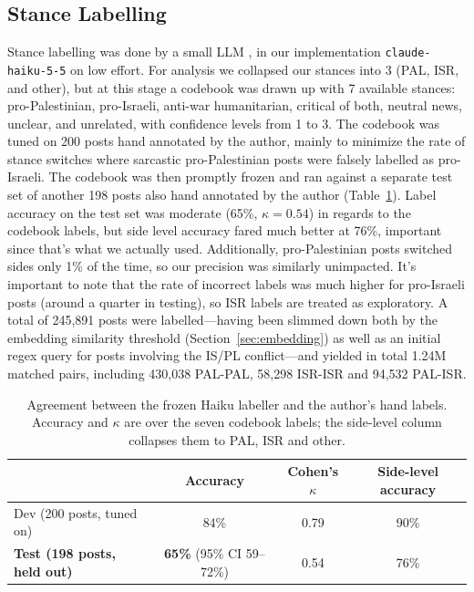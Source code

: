 \documentclass[11pt]{article}   %
\begin{document}
\subsection{Stance Labelling}\label{sec:stance}

Stance labelling was done by a small LLM \parencite[following][]{QuelleBovet2025}, in our implementation
\texttt{claude-haiku-5-5} on low effort. For analysis we collapsed our stances into 3 (PAL, ISR, and other), but at this stage a codebook was drawn up with 7 available stances:
pro-Palestinian, pro-Israeli, anti-war humanitarian, critical of both, neutral news, unclear, and unrelated, with confidence levels from 1 to 3. The codebook was tuned on 200 posts hand annotated by the author, mainly to minimize the rate
of stance switches where sarcastic pro-Palestinian posts were falsely labelled as pro-Israeli. The codebook was then promptly frozen and ran against a separate test set of another 198 posts also hand annotated by the author (Table~\ref{tab:stance-accuracy}).
Label accuracy on the test set was moderate (65\%, $\kappa = 0.54$) in regards to the codebook labels, but side level accuracy fared much better at 76\%, important since that's what we actually used. Additionally, pro-Palestinian posts
switched sides only 1\% of the time, so our precision was similarly unimpacted. It's important to note that the rate of incorrect labels
was much higher for pro-Israeli posts (around a quarter in testing), so ISR labels are treated as exploratory. A total of 245,891 posts were labelled—having been slimmed down both by the embedding similarity threshold (Section~\ref{sec:embedding}) as well
as an initial regex query for posts involving the IS/PL conflict—and yielded in total 1.24M matched pairs, including 430,038 PAL-PAL, 58,298 ISR-ISR and 94,532 PAL-ISR.\bigskip

\begin{table}[h]
\centering
\begin{tabular}{lccc}
\toprule
 & Accuracy & Cohen's $\kappa$ & Side-level accuracy \\
\midrule
Dev (200 posts, tuned on) & 84\% & 0.79 & 90\% \\
\textbf{Test (198 posts, held out)} & \textbf{65\%} (95\% CI 59--72\%) & 0.54 & 76\% \\
\bottomrule
\end{tabular}
\caption{Agreement between the frozen Haiku labeller and the author's hand labels. Accuracy and $\kappa$ are over
the seven codebook labels; the side-level column collapses them to PAL, ISR and other.}
\label{tab:stance-accuracy}
\end{table}
\end{document}
